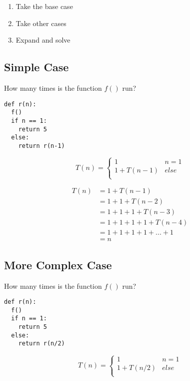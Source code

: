 \documentclass[12pt]{article}
\begin{document}
\begin{enumerate}
\item Take the base case
\item Take other cases
\item Expand and solve
\end{enumerate}

\subsection{Simple Case}
\label{sec-3-1}

How many times is the function $f()$ run?

\lstset{language=Python,label= ,caption= ,numbers=none}
\begin{lstlisting}
def r(n):
  f()
  if n == 1:
    return 5
  else:
    return r(n-1)
\end{lstlisting}

\[ T(n) = 
\begin{cases}
1 & n = 1 \\
1 + T(n-1) & else \\
\end{cases}
\]

\begin{align}
  T(n) &= 1 + T(n-1) \\
  &= 1 + 1 + T(n-2) \\
  &= 1 + 1 + 1 + T(n-3) \\
  &= 1 + 1 + 1 + 1 + T(n-4) \\
  &= 1 + 1 + 1 + 1 + ... + 1 \\
  &= n
\end{align}

\subsection{More Complex Case}
\label{sec-3-2}

How many times is the function $f()$ run?

\lstset{language=Python,label= ,caption= ,numbers=none}
\begin{lstlisting}
def r(n):
  f()
  if n == 1:
    return 5
  else:
    return r(n/2)
\end{lstlisting}

\[ T(n) = 
\begin{cases}
1 & n = 1 \\
1 + T(n/2) & else \\
\end{cases}
\]
\end{document}
